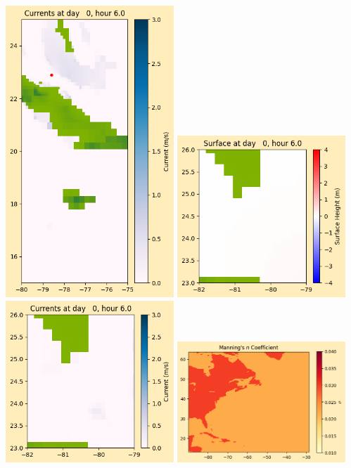 \documentclass[11pt]{article}
\begin{document}
\includegraphics[width=0.475\textwidth]{frame0013fig1008.png}
\vskip 10pt 
\includegraphics[width=0.475\textwidth]{frame0013fig1009.png}
\includegraphics[width=0.475\textwidth]{frame0013fig1010.png}
\vskip 10pt 
\includegraphics[width=0.475\textwidth]{frame0013fig1011.png}
\end{document}

